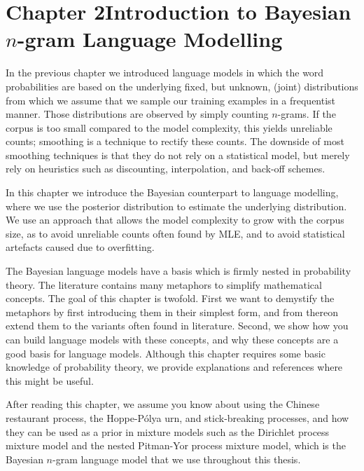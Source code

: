 \chapter{Chapter 2\newline Introduction to Bayesian $n$-gram %
Language Modelling}

In the previous chapter we introduced language models in which the word probabilities are based on the underlying fixed, but unknown, (joint) distributions from which we assume that we sample our training examples in a frequentist manner. Those distributions are observed by simply counting $n$-grams. If the corpus is too small compared to the model complexity, this yields unreliable counts; smoothing is a technique to rectify these counts.  The downside of most smoothing techniques is that they do not rely on a statistical model, but merely rely on heuristics such as discounting, interpolation, and back-off schemes.

In this chapter we introduce the Bayesian counterpart to language modelling, where we use the posterior distribution to estimate the underlying distribution. We use an approach that allows the model complexity to grow with the corpus size, as to avoid unreliable counts often found by MLE, and to avoid statistical artefacts caused due to overfitting. 

The Bayesian language models have a basis which is firmly nested in probability theory. The literature contains many metaphors to simplify mathematical concepts. The goal of this chapter is twofold. First we want to demystify the metaphors by first introducing them in their simplest form, and from thereon extend them to the variants often found in literature. Second, we show how you can build language models with these concepts, and why these concepts are a good basis for language models. Although this chapter requires some basic knowledge of probability theory, we provide explanations and references where this might be useful.

After reading this chapter, we assume you know about using the Chinese restaurant process, the Hoppe-P\'olya urn, and stick-breaking processes, and how they can be used as a prior in mixture models such as the Dirichlet process mixture model and the nested Pitman-Yor process mixture model, which is the Bayesian $n$-gram language model that we use throughout this thesis.

\newpage


